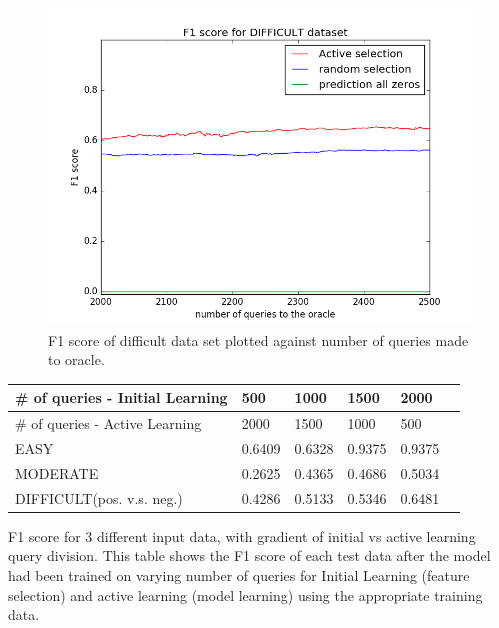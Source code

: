 \documentclass[paper=a4, fontsize=11pt]{scrartcl}
\numberwithin{equation}{section}    %
\numberwithin{figure}{section}      %
\numberwithin{table}{section}       %
\numberwithin{equation}{section}    %
\numberwithin{figure}{section}      %
\numberwithin{table}{section}       %
\begin{document}
\begin{figure}[!htb]
  \centering
  \includegraphics[scale = 0.5]{figures/f1_difficult.png}
      \caption{F1 score of difficult data set plotted against number of queries made to oracle.}
      \label{hardf}
\end{figure}

\FloatBarrier

\begin{minipage}{\linewidth}
\smallskip
\centering
{} \label{f1table} 
\begin{tabular}{ p{2in} C{.85in} *4{C{.7in}}}\toprule[1.5pt]
\# of queries - Initial Learning & 500 & 1000 & 1500 & 2000  \\ \toprule[1.5pt]
\# of queries - Active Learning & 2000 & 1500 & 1000 & 500  \\ \bottomrule[1.25pt]
EASY                        & 0.6409                             & 0.6328                              & 0.9375                              & 0.9375                              \\
MODERATE                    & 0.2625                             & 0.4365                              & 0.4686                              & 0.5034                              \\
DIFFICULT(pos. v.s. neg.)   & 0.4286                             & 0.5133                              & 0.5346                              & 0.6481\\
\bottomrule[1.25pt]
\end{tabular} \par \bigskip
F1 score for 3 different input data, with gradient of initial vs active learning query division. 
This table shows the F1 score of each test data after the model had been trained on varying number of queries for Initial Learning (feature selection) and active learning (model learning) using the appropriate training data. 
\end{minipage}
\FloatBarrier
\end{document}
